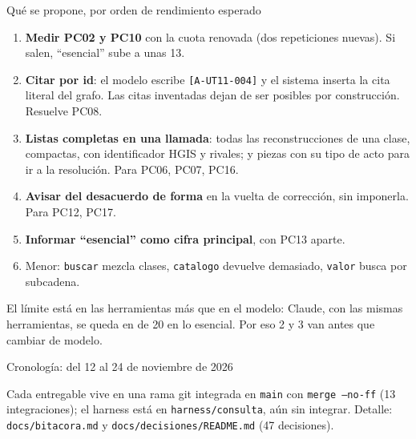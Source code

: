 \documentclass[aspectratio=169,10pt]{beamer}
\newcommand{\ttt}[1]{\texttt{\small #1}}
\begin{document}
\begin{frame}{Qué se propone, por orden de rendimiento esperado}
\begin{enumerate}\small
\item \textbf{Medir PC02 y PC10} con la cuota renovada (dos repeticiones nuevas). Si salen, \enquote{esencial} sube a unas 13.
\item \textbf{Citar por id}: el modelo escribe \ttt{[A-UT11-004]} y el sistema inserta la cita literal del grafo. Las
      citas inventadas dejan de ser posibles \alert{por construcción}. Resuelve PC08.
\item \textbf{Listas completas en una llamada}: todas las reconstrucciones de una clase, compactas, con identificador HGIS
      y rivales; y piezas con su tipo de acto para ir a la resolución. Para PC06, PC07, PC16.
\item \textbf{Avisar del desacuerdo de forma} en la vuelta de corrección, sin imponerla. Para PC12, PC17.
\item \textbf{Informar \enquote{esencial} como cifra principal}, con PC13 aparte.
\item Menor: \ttt{buscar} mezcla clases, \ttt{catalogo} devuelve demasiado, \ttt{valor} busca por subcadena.
\end{enumerate}
\medskip
\small
\alert{El límite está en las herramientas más que en el modelo}: Claude, con las mismas herramientas, se queda en
\interEsencial{} de 20 en lo esencial. Por eso 2 y 3 van antes que cambiar de modelo.
\end{frame}

\begin{frame}{Cronología: del 12 al 24 de noviembre de 2026}
\centering
{}

\medskip
\footnotesize Cada entregable vive en una rama git integrada en \ttt{main} con \ttt{merge --no-ff} (13 integraciones); el
harness está en \ttt{harness/consulta}, aún sin integrar. Detalle: \ttt{docs/bitacora.md} y \ttt{docs/decisiones/README.md}
(47 decisiones).
\end{frame}
\end{document}
